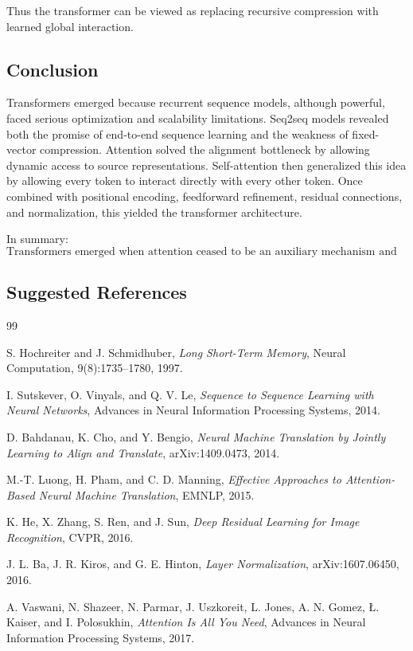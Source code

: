 Thus the transformer can be viewed as replacing recursive compression with learned global interaction.

\subsection{Conclusion}

Transformers emerged because recurrent sequence models, although powerful, faced serious optimization and scalability limitations. Seq2seq models revealed both the promise of end-to-end sequence learning and the weakness of fixed-vector compression. Attention solved the alignment bottleneck by allowing dynamic access to source representations. Self-attention then generalized this idea by allowing every token to interact directly with every other token. Once combined with positional encoding, feedforward refinement, residual connections, and normalization, this yielded the transformer architecture.

In summary:
\[
\boxed{
\text{Transformers emerged when attention ceased to be an auxiliary mechanism and became the main computational principle.}
}
\]

\subsection*{Suggested References}
\begin{thebibliography}{99}

S. Hochreiter and J. Schmidhuber,
\emph{Long Short-Term Memory},
Neural Computation, 9(8):1735--1780, 1997.

I. Sutskever, O. Vinyals, and Q. V. Le,
\emph{Sequence to Sequence Learning with Neural Networks},
Advances in Neural Information Processing Systems, 2014.

D. Bahdanau, K. Cho, and Y. Bengio,
\emph{Neural Machine Translation by Jointly Learning to Align and Translate},
arXiv:1409.0473, 2014.

M.-T. Luong, H. Pham, and C. D. Manning,
\emph{Effective Approaches to Attention-Based Neural Machine Translation},
EMNLP, 2015.

K. He, X. Zhang, S. Ren, and J. Sun,
\emph{Deep Residual Learning for Image Recognition},
CVPR, 2016.

J. L. Ba, J. R. Kiros, and G. E. Hinton,
\emph{Layer Normalization},
arXiv:1607.06450, 2016.

A. Vaswani, N. Shazeer, N. Parmar, J. Uszkoreit, L. Jones, A. N. Gomez, \L. Kaiser, and I. Polosukhin,
\emph{Attention Is All You Need},
Advances in Neural Information Processing Systems, 2017.

\end{thebibliography}